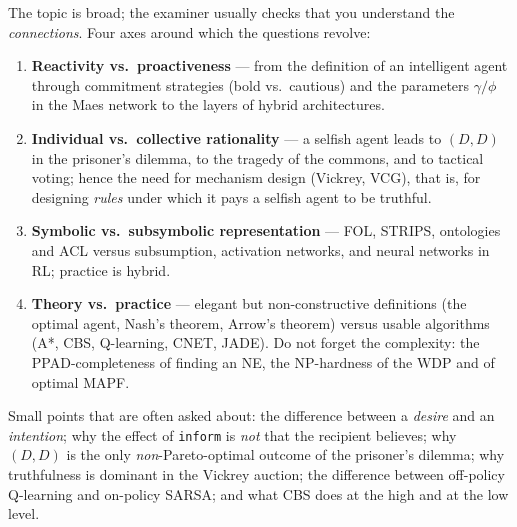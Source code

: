 \documentclass[11pt,a4paper]{article}
\theoremstyle{definition}
\begin{document}
The topic is broad; the examiner usually checks that you understand the \emph{connections}.
Four axes around which the questions revolve:
\begin{enumerate}
\item \textbf{Reactivity vs.\ proactiveness} --- from the definition of an intelligent agent
  through commitment strategies (bold vs.\ cautious) and the parameters $\gamma/\phi$ in the
  Maes network to the layers of hybrid architectures.
\item \textbf{Individual vs.\ collective rationality} --- a selfish agent leads to $(D,D)$ in
  the prisoner's dilemma, to the tragedy of the commons, and to tactical voting; hence the need
  for mechanism design (Vickrey, VCG), that is, for designing \emph{rules} under which it pays a
  selfish agent to be truthful.
\item \textbf{Symbolic vs.\ subsymbolic representation} --- FOL, STRIPS, ontologies and ACL
  versus subsumption, activation networks, and neural networks in RL; practice is hybrid.
\item \textbf{Theory vs.\ practice} --- elegant but non-constructive definitions (the optimal
  agent, Nash's theorem, Arrow's theorem) versus usable algorithms (A*, CBS, Q-learning, CNET,
  JADE). Do not forget the complexity: the PPAD-completeness of finding an NE, the NP-hardness
  of the WDP and of optimal MAPF.
\end{enumerate}

Small points that are often asked about: the difference between a \emph{desire} and an
\emph{intention}; why the effect of \texttt{inform} is \emph{not} that the recipient believes;
why $(D,D)$ is the only \emph{non}-Pareto-optimal outcome of the prisoner's dilemma; why
truthfulness is dominant in the Vickrey auction; the difference between off-policy Q-learning
and on-policy SARSA; and what CBS does at the high and at the low level.
\end{document}
